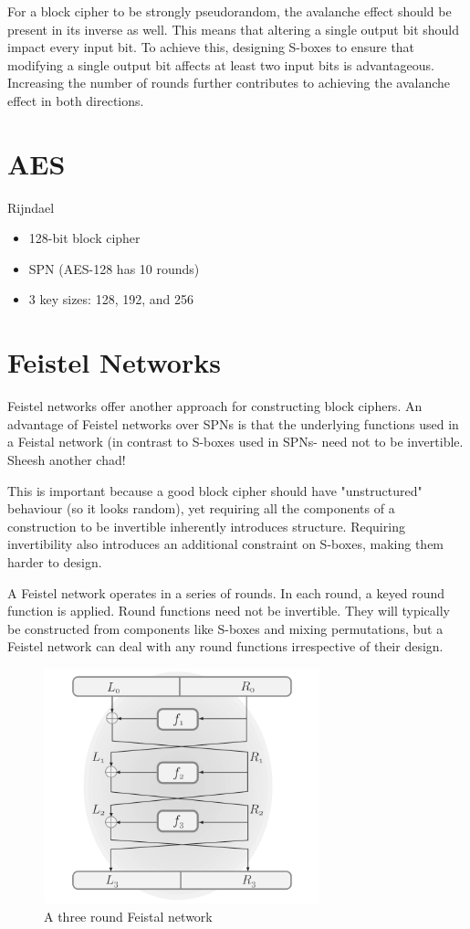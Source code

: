 \documentclass[12pt]{article}
\begin{document}
For a block cipher to be strongly pseudorandom, the avalanche effect should be present in its inverse as well. This means that altering a single output bit should impact every input bit. To achieve this, designing S-boxes to ensure that modifying a single output bit affects at least two input bits is advantageous. Increasing the number of rounds further contributes to achieving the avalanche effect in both directions.
\newpage
\section{AES}
Rijndael
\begin{itemize}
\item 128-bit block cipher
\item SPN (AES-128 has 10 rounds)
\item 3 key sizes: 128, 192, and 256
\end{itemize}


\section{Feistel Networks}
Feistel networks offer another approach for constructing block ciphers. An advantage of Feistel networks over SPNs is that the underlying functions used in a Feistal network (in contrast to S-boxes used in SPNs- need not to be invertible. Sheesh another chad!

This is important because a good block cipher should have "unstructured" behaviour (so it looks random), yet requiring all the components of a construction to be invertible inherently introduces structure. Requiring invertibility also introduces an additional constraint on S-boxes, making them harder to design.

A Feistel network operates in a series of rounds. In each round, a keyed round function is applied. Round functions need not be invertible. They will typically be constructed from components like S-boxes and mixing permutations, but a Feistel network can deal with any round functions irrespective of their design.
\begin{figure}[ht]
    \centering
    \includegraphics[width=8cm]{figures/f4.png}
    \caption{A three round Feistal network }
\end{figure}
\end{document}
